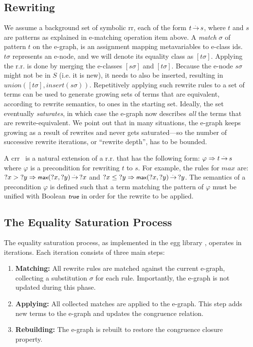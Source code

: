 \subsection{Rewriting}
We assume a background set of symbolic \gls{rr}, each of the form $t\operatorname{\overset{.\,}{\rightarrow}} s$,
where $t$ and $s$ are patterns as explained in e-matching operation item above.
A \emph{match} $\sigma$ of pattern $t$ on the e-graph, is an assignment mapping metavariables to e-class ids.
$t\sigma$ represents an e-node, and we will denote its equality class as $[t\sigma]$.
Applying the r.r. is done by merging the e-classes $[s\sigma]$ and $[t\sigma]$. 
Because the e-node $s\sigma$ might not be in $S$ (i.e. it is new), it needs to also be inserted, resulting in $union([t\sigma], insert(s\sigma))$.
Repetitively applying such rewrite rules to a set of terms can be used to generate growing sets of terms that are equivalent, according to rewrite semantics, to ones in the starting set.
Ideally, the set eventually \emph{saturates}, in which case the e-graph now describes \emph{all} the
terms that are rewrite-equivalent.
We point out that in many situations, the e-graph keeps growing as a result of rewrites and never gets saturated---so the number of successive rewrite iterations, or ``rewrite depth'', has to be bounded.

A \gls{crr}~\cite{jcss/Bergstra} is a natural extension of a r.r. that has the following form:
$\varphi \Rightarrow t \operatorname{\overset{.\,}{\rightarrow}} s$
where $\varphi$ is a precondition for rewriting $t$ to $s$. For example, the rules for $max$ are:
${?x} > {?y} \Rightarrow \tmax({?x}, {?y}) \rwto {?x}$ and 
${?x} \leq {?y} \Rightarrow \tmax({?x}, {?y}) \rwto {?y}$.
%
The semantics of a precondition $\varphi$ is defined such that a term matching the pattern of $\varphi$
must be unified with Boolean $\ttrue$ in order for the rewrite to be applied.

\subsection{The Equality Saturation Process}

The equality saturation process, as implemented in the egg library \cite{egg}, operates in iterations. Each iteration consists of three main steps:

\begin{enumerate}
    \item \textbf{Matching:} All rewrite rules are matched against the current e-graph, collecting a substitution $\sigma$ for each rule. 
    Importantly, the e-graph is not updated during this phase.
    \item \textbf{Applying:} All collected matches are applied to the e-graph. 
    This step adds new terms to the e-graph and updates the congruence relation.
    \item \textbf{Rebuilding:} The e-graph is rebuilt to restore the congruence closure property.
\end{enumerate}

